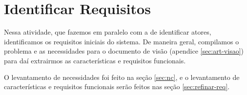 \section{Identificar Requisitos}
\label{sec:requisitos}

Nessa atividade, que fazemos em paralelo com a de identificar atores, identificamos os requisitos iniciais do sistema. De maneira geral, compilamos o problema e as necessidades para o documento de visão (apendice \ref{sec:art-visao}) para daí extrairmos as características e requisitos funcionais.

O levantamento de necessidades foi feito na seção \ref{sec:nc}, e o levantamento de características e requisitos funcionais serão feitos nas seção \ref{sec:refinar-req}.
